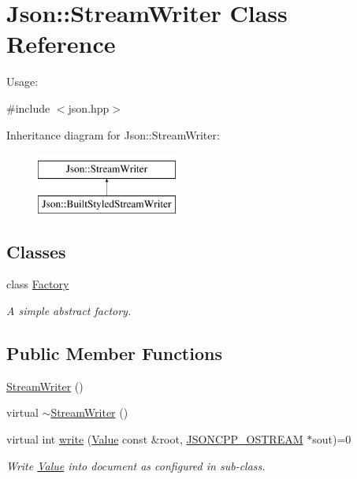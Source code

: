 \hypertarget{classJson_1_1StreamWriter}{}\section{Json\+:\+:Stream\+Writer Class Reference}
\label{classJson_1_1StreamWriter}


Usage\+:  




{\ttfamily \#include $<$json.\+hpp$>$}

Inheritance diagram for Json\+:\+:Stream\+Writer\+:\begin{figure}[H]
\begin{center}
\leavevmode
\includegraphics[height=2.000000cm]{classJson_1_1StreamWriter}
\end{center}
\end{figure}
\subsection*{Classes}
\begin{DoxyCompactItemize}
\item 
class \hyperlink{classJson_1_1StreamWriter_1_1Factory}{Factory}
\begin{DoxyCompactList}\small\item\em A simple abstract factory. \end{DoxyCompactList}\end{DoxyCompactItemize}
\subsection*{Public Member Functions}
\begin{DoxyCompactItemize}
\item 
\hyperlink{classJson_1_1StreamWriter_a66e6f5113618ce6b04cac9b3c85a3707}{Stream\+Writer} ()
\item 
virtual \hyperlink{classJson_1_1StreamWriter_a03f8fb6a873b6b50f05bc4556e043c3a}{$\sim$\+Stream\+Writer} ()
\item 
virtual int \hyperlink{classJson_1_1StreamWriter_a84278bad0c9a9fc587bc2a97c5bb5993}{write} (\hyperlink{classJson_1_1Value}{Value} const \&root, \hyperlink{json_8hpp_a37a25be5fca174927780caeb280094ce}{J\+S\+O\+N\+C\+P\+P\+\_\+\+O\+S\+T\+R\+E\+AM} $\ast$sout)=0
\begin{DoxyCompactList}\small\item\em Write \hyperlink{classJson_1_1Value}{Value} into document as configured in sub-\/class. \end{DoxyCompactList}\end{DoxyCompactItemize}
